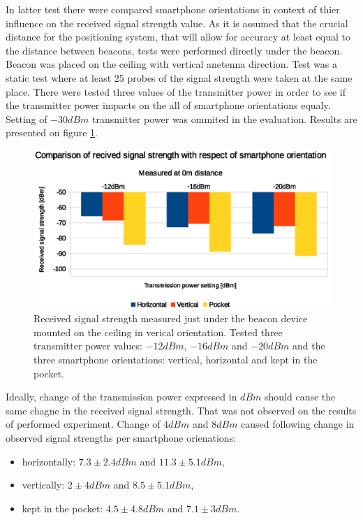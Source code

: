 \documentclass[../main.tex]{subfiles}
\begin{document}
In latter test there were compared smartphone orientations in context of thier influence on the received signal strength value. As it is assumed that the crucial distance for the positioning system, that will allow for accuracy at least equal to the distance between beacons, tests were performed directly under the beacon. Beacon was placed on the ceiling with vertical anetenna direction. Test was a static test where at least 25 probes of the signal strength were taken at the same place. There were tested three values of the transmitter power in order to see if the transmitter power impacts on the all of smartphone orientations equaly. Setting of $-30dBm$ transmitter power was ommited in the evaluation. Results are presented on figure \ref{fig:tests_case3_rssi_vs_smartphone_orientation}.

\begin{figure}[!htbp]
\includegraphics[width=\textwidth, keepaspectratio]{pictures/tests_case3_rssi_vs_smartphone_orientation}
\centering
\caption{Received signal strength measured just under the beacon device mounted on the ceiling in verical orientation. Tested three transmitter power values: $-12dBm$, $-16dBm$ and $-20dBm$ and the three smartphone orientations: vertical, horizontal and kept in the pocket.}
\label{fig:tests_case3_rssi_vs_smartphone_orientation}
\end{figure}

Ideally, change of the transmission power expressed in $dBm$ should cause the same chagne in the received signal strength. That was not observed on the results of performed experiment. Change of $4 dBm$ and $8 dBm$ caused following change in observed signal strengths per smartphone orienations:
\begin{itemize}
	\item horizontally: $7.3\pm2.4 dBm$ and $11.3\pm5.1 dBm$,
	\item vertically: $2\pm4 dBm$ and $8.5\pm5.1 dBm$,
	\item kept in the pocket: $4.5\pm4.8 dBm$ and $7.1\pm3 dBm$.
\end{itemize}
\end{document}
